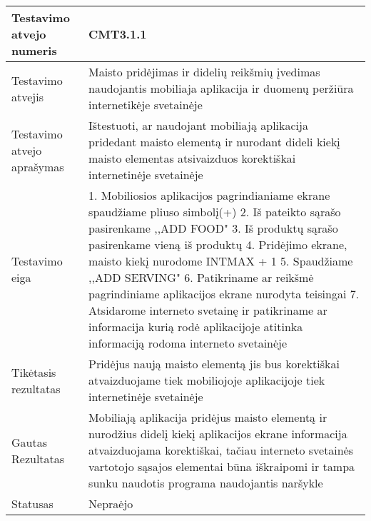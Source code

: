 \documentclass[oneside]{VUMIFPSkursinis}
\begin{document}
\iffalse XXXXXXXXXXXXXXXXXXXXXXXXXXXXXXXXXXXXXXXXXXXXXXXXXXXXXXXXXXXXXXXXXXXXXXXXXXXXXXXXXXXXXXXXXXXXXXXXXXXXXXXXXXXXXXXXXXXXXXXXXXXXXXXXXXXXXXX \fi
\begin{center}
    \begin{tabular}{ |p{5cm}|p{13cm}|}
    \hline
    	Testavimo atvejo numeris & CMT3.1.1\\ \hline
    	Testavimo atvejis & Maisto pridėjimas ir didelių reikšmių įvedimas naudojantis mobiliaja aplikacija ir duomenų peržiūra internetikėje svetainėje \\ \hline
	Testavimo atvejo aprašymas &Ištestuoti, ar naudojant mobiliają aplikacija pridedant maisto elementą ir nurodant dideli kiekį maisto elementas atsivaizduos korektiškai internetinėje svetainėje   \\ \hline
	Testavimo eiga & 1. Mobiliosios aplikacijos pagrindianiame ekrane spaudžiame pliuso simbolį(+)
				2. Iš pateikto sąrašo pasirenkame ,,ADD FOOD"
				3. Iš produktų sąrašo pasirenkame vieną iš produktų
				4. Pridėjimo ekrane, maisto kiekį nurodome INTMAX + 1
				5. Spaudžiame ,,ADD SERVING"
				6. Patikriname ar reikšmė pagrindiniame aplikacijos ekrane nurodyta teisingai
				7. Atsidarome interneto svetainę ir patikriname ar informacija kurią rodė aplikacijoje atitinka informaciją rodoma interneto svetainėje \\ \hline
	Tikėtasis rezultatas &  Pridėjus naują maisto elementą jis bus korektiškai atvaizduojame tiek mobiliojoje aplikacijoje tiek internetinėje svetainėje\\ \hline
	Gautas Rezultatas & Mobiliają aplikacija pridėjus maisto elementą ir nurodžius didelį kiekį aplikacijos ekrane informacija atvaizduojama korektiškai, tačiau interneto svetainės vartotojo sąsajos elementai būna iškraipomi ir tampa sunku naudotis programa naudojantis naršykle  \\ \hline
	Statusas &  Nepraėjo\\ \hline
    \hline
    \end{tabular}
\end{center}
\end{document}
